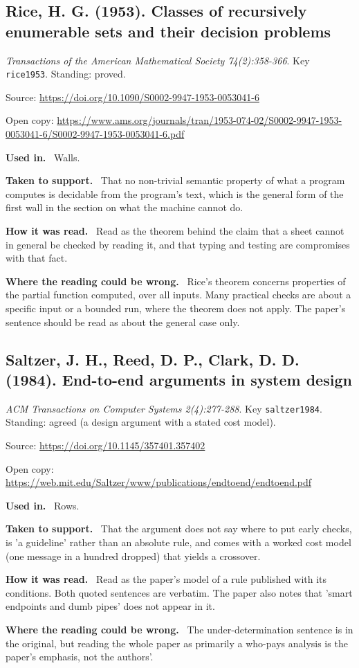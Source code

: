 \documentclass[11pt,oneside]{article}
\newcommand{\field}[1]{\par\noindent\textbf{\color{accent}#1.}\ }
\begin{document}
\hypertarget{src:rice1953}{}
\subsection*{Rice, H. G. (1953). Classes of recursively enumerable sets and their decision problems}
\noindent\small\emph{Transactions of the American Mathematical Society 74(2):358-366}. Key \texttt{rice1953}. Standing: proved.
\par\noindent\small Source: \url{https://doi.org/10.1090/S0002-9947-1953-0053041-6}
\par\noindent\small Open copy: \url{https://www.ams.org/journals/tran/1953-074-02/S0002-9947-1953-0053041-6/S0002-9947-1953-0053041-6.pdf}
\normalsize
\field{Used in} Walls.
\field{Taken to support} That no non-trivial semantic property of what a program computes is decidable from the program's text, which is the general form of the first wall in the section on what the machine cannot do.
\field{How it was read} Read as the theorem behind the claim that a sheet cannot in general be checked by reading it, and that typing and testing are compromises with that fact.
\field{Where the reading could be wrong} Rice's theorem concerns properties of the partial function computed, over all inputs. Many practical checks are about a specific input or a bounded run, where the theorem does not apply. The paper's sentence should be read as about the general case only.

\hypertarget{src:saltzer1984}{}
\subsection*{Saltzer, J. H., Reed, D. P., Clark, D. D. (1984). End-to-end arguments in system design}
\noindent\small\emph{ACM Transactions on Computer Systems 2(4):277-288}. Key \texttt{saltzer1984}. Standing: agreed (a design argument with a stated cost model).
\par\noindent\small Source: \url{https://doi.org/10.1145/357401.357402}
\par\noindent\small Open copy: \url{https://web.mit.edu/Saltzer/www/publications/endtoend/endtoend.pdf}
\normalsize
\field{Used in} Rows.
\field{Taken to support} That the argument does not say where to put early checks, is 'a guideline' rather than an absolute rule, and comes with a worked cost model (one message in a hundred dropped) that yields a crossover.
\field{How it was read} Read as the paper's model of a rule published with its conditions. Both quoted sentences are verbatim. The paper also notes that 'smart endpoints and dumb pipes' does not appear in it.
\field{Where the reading could be wrong} The under-determination sentence is in the original, but reading the whole paper as primarily a who-pays analysis is the paper's emphasis, not the authors'.
\end{document}
